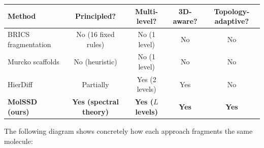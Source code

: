 \documentclass[12pt,a4paper]{article}
\begin{document}
\begin{center}
\begin{tabular}{lcccc}
\toprule
\textbf{Method} & \textbf{Principled?} & \textbf{Multi-level?} & \textbf{3D-aware?} & \textbf{Topology-adaptive?} \\
\midrule
BRICS fragmentation & No (16 fixed rules) & No (1 level) & No & No \\
Murcko scaffolds & No (heuristic) & No (1 level) & No & No \\
HierDiff & Partially & Yes (2 levels) & Yes & No \\
\textbf{MolSSD (ours)} & \textbf{Yes (spectral theory)} & \textbf{Yes ($L$ levels)} & \textbf{Yes} & \textbf{Yes} \\
\bottomrule
\end{tabular}
\end{center}

The following diagram shows concretely how each approach fragments the same molecule:
\end{document}
